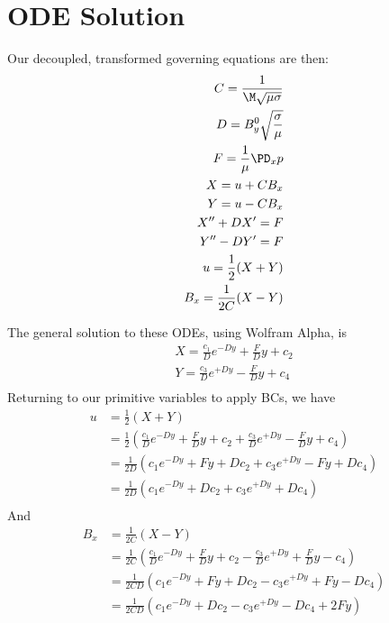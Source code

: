 \documentclass[11pt]{article}
\begin{document}
\doublespacing
\MOONSTITLE
\maketitle

\section{ODE Solution}
Our decoupled, transformed governing equations are then:
\begin{equation}\begin{aligned}
C = \frac{1}{\M \sqrt{\mu \sigma}} \\
D = B_y^0 \sqrt{\frac{\sigma}{\mu}} \\
F = \frac{1}{\mu} \PD_x p \\
X = u + C B_x \\
Y = u - C B_x \\
X'' + D X' = F \\
Y'' - D Y' = F \\
u   = \frac{1}{2}  (X+Y) \\
B_x = \frac{1}{2C} (X-Y) \\
\end{aligned} \end{equation}

The general solution to these ODEs, using Wolfram Alpha, is
\begin{equation}\begin{aligned}
X = \frac{c_1}{D} e^{-D y} + \frac{F}{D} y + c_2  \\
Y = \frac{c_3}{D} e^{+D y} - \frac{F}{D} y + c_4  \\
\end{aligned} \end{equation}
Returning to our primitive variables to apply BCs, we have
\begin{equation}\begin{aligned}
u & = \frac{1}{2} (X+Y) \\
  & = \frac{1}{2} \left( \frac{c_1}{D} e^{-D y} + \frac{F}{D} y + c_2+\frac{c_3}{D} e^{+D y} - \frac{F}{D} y + c_4 \right) \\
  & = \frac{1}{2D} ( c_1 e^{-D y} + F y + D c_2 + c_3 e^{+D y} - F y + D c_4 ) \\
  & = \frac{1}{2D} ( c_1 e^{-D y} + D c_2 + c_3 e^{+D y} + D c_4 ) \\
\end{aligned} \end{equation}
And
\begin{equation}\begin{aligned}
B_x & = \frac{1}{2C} (X-Y) \\
    & = \frac{1}{2C} \left(\frac{c_1}{D} e^{-D y} + \frac{F}{D} y + c_2 - \frac{c_3}{D} e^{+D y} + \frac{F}{D} y - c_4\right) \\
    & = \frac{1}{2CD} (c_1 e^{-D y} + F y + D c_2 - c_3 e^{+D y} + F y - D c_4) \\
    & = \frac{1}{2CD} (c_1 e^{-D y} + D c_2 - c_3 e^{+D y} - D c_4 + 2F y) \\
\end{aligned} \end{equation}
\end{document}
